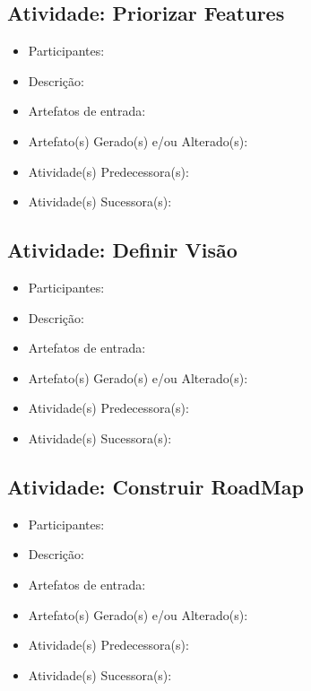 \subsection{Atividade: Priorizar Features}
\begin{itemize}
\item Participantes: 

\item Descrição: 

\item Artefatos de entrada: 

\item Artefato(s) Gerado(s) e/ou Alterado(s): 

\item Atividade(s) Predecessora(s): 
  
\item Atividade(s) Sucessora(s): 
\end{itemize}


\subsection{Atividade: Definir Visão}
\begin{itemize}
\item Participantes: 

\item Descrição: 

\item Artefatos de entrada: 

\item Artefato(s) Gerado(s) e/ou Alterado(s): 

\item Atividade(s) Predecessora(s): 
  
\item Atividade(s) Sucessora(s): 
\end{itemize}


\subsection{Atividade: Construir RoadMap}
\begin{itemize}
\item Participantes: 

\item Descrição: 

\item Artefatos de entrada: 

\item Artefato(s) Gerado(s) e/ou Alterado(s): 

\item Atividade(s) Predecessora(s): 
  
\item Atividade(s) Sucessora(s): 
\end{itemize}

